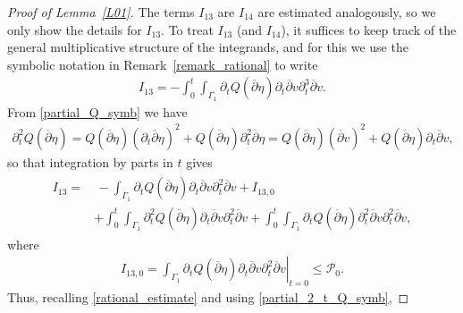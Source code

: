 \documentclass[10pt,reqno]{amsart}
\makeatletter
\theoremstyle{plain}
\theoremstyle{definition}
\numberwithin{equation}{section}
\newcommand{\ccPz}{\mathscr{P}_0}
\newcommand{\Ga}{\Gamma}
\newcommand{\norm}[1]{\Vert#1\Vert}
\def\paragraph{\@startsection{paragraph}{4}%
  \z@\z@{-\fontdimen2\font}%
  {\normalfont\it}}
\makeatother
\begin{document}
\begin{proof}[Proof of Lemma~\ref{L01}]
The terms $I_{13}$ are $I_{14}$ are estimated analogously, so we only
show the details for $I_{13}$.
To treat $I_{13}$ (and $I_{14}$), it suffices
to keep track of the general multiplicative structure of the integrands, and for this
we use the symbolic notation in Remark~\ref{remark_rational} to write
\begin{gather}
I_{13}
= - \int_0^t \int_{\Ga_1} \partial_t Q(\overline{\partial} \eta)
\partial_t \overline{\partial} v \partial^3_t \overline{\partial} v.
\nonumber
\end{gather}
From \eqref{partial_Q_symb} we have
\begin{gather}
\partial^2_t Q(\overline{\partial} \eta) = Q( \overline{\partial} \eta) 
(\partial_t \overline{\partial} \eta)^2 + 
Q( \overline{\partial} \eta) 
\partial^2_t \overline{\partial} \eta
=
Q( \overline{\partial} \eta) 
(\overline{\partial} v)^2 + 
Q( \overline{\partial} \eta) 
\partial_t \overline{\partial} v
,
\label{partial_2_t_Q_symb}
\end{gather}
so that integration by parts in $t$ gives
\begin{align}
\begin{split}
I_{13} = & \, 
-\int_{\Ga_1} \partial_t Q(\overline{\partial}\eta) \partial_t \overline{\partial}v \partial^2_t \overline{\partial}v 
+ I_{13,0}
\\
&
+ \int_0^t \int_{\Ga_1} \partial^2_t Q(\overline{\partial} \eta) \partial_t 
\overline{\partial} v \partial^2_t \overline{\partial} v
+\int_0^t \int_{\Ga_1} \partial_t Q(\overline{\partial} \eta)
\partial^2_t \overline{\partial} v \partial^2_t \overline{\partial} v,
\end{split}
\nonumber
\end{align}
where 
\begin{gather}
I_{13,0} =
\left. 
\int_{\Ga_1} \partial_t Q(\overline{\partial}\eta) \partial_t \overline{\partial}v \partial^2_t \overline{\partial}v 
\right|_{t=0}\leq \ccPz
.
\nonumber
\end{gather}
Thus, recalling \eqref{rational_estimate} and using \eqref{partial_2_t_Q_symb},

\end{proof}
\end{document}

